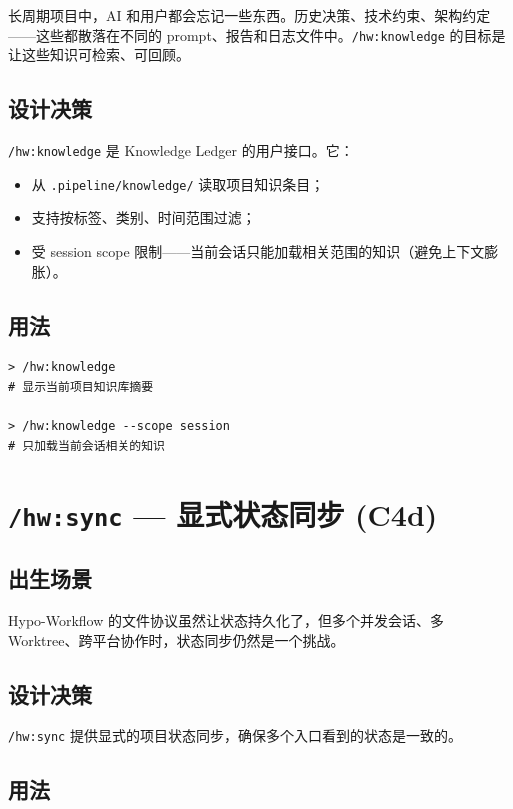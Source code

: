 \documentclass[
  outputdir=build,
  chapterstyle=cn,
  colorscheme=Simple,
  fontset=tech,
  code=false
]{Hypo-Note}
\begin{document}
长周期项目中，AI 和用户都会忘记一些东西。历史决策、技术约束、架构约定——这些都散落在不同的 prompt、报告和日志文件中。\texttt{/hw:knowledge} 的目标是让这些知识可检索、可回顾。

\subsection{设计决策}

\texttt{/hw:knowledge} 是 Knowledge Ledger 的用户接口。它：

\begin{itemize}[leftmargin=2em]
  \item 从 \texttt{.pipeline/knowledge/} 读取项目知识条目；
  \item 支持按标签、类别、时间范围过滤；
  \item 受 session scope 限制——当前会话只能加载相关范围的知识（避免上下文膨胀）。
\end{itemize}

\subsection{用法}

\begin{lstlisting}[caption=查看项目知识]
> /hw:knowledge
# 显示当前项目知识库摘要

> /hw:knowledge --scope session
# 只加载当前会话相关的知识
\end{lstlisting}

\section{\texttt{/hw:sync} — 显式状态同步 (C4d)}

\subsection{出生场景}

Hypo-Workflow 的文件协议虽然让状态持久化了，但多个并发会话、多 Worktree、跨平台协作时，状态同步仍然是一个挑战。

\subsection{设计决策}

\texttt{/hw:sync} 提供显式的项目状态同步，确保多个入口看到的状态是一致的。

\subsection{用法}
\end{document}
